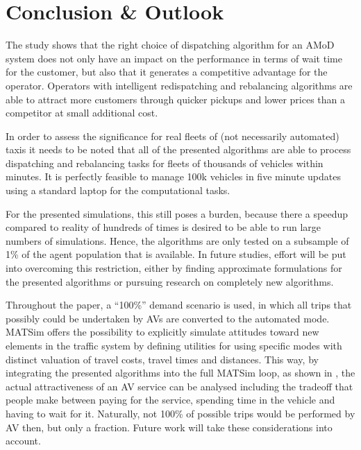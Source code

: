 \section{Conclusion \& Outlook}
\label{sec:Conclusion}

The study shows that the right choice of dispatching algorithm for an AMoD system
does not only have an impact on the performance in terms of wait time for
the customer, but also that it generates a competitive advantage for the
operator. Operators with intelligent redispatching and rebalancing algorithms are able to attract
more customers through quicker pickups and lower prices than a competitor at small additional cost.

In order to assess the significance for real fleets of (not necessarily
automated) taxis it needs to be noted that all of the presented algorithms are
able to process dispatching and rebalancing tasks for fleets of thousands of
vehicles within minutes. It is perfectly feasible to manage 100k vehicles in
five minute updates using a standard laptop for the computational tasks.

For the presented simulations, this still poses a burden, because there
a speedup compared to reality of hundreds of times is desired to be able
to run large numbers of simulations. Hence, the algorithms
are only tested on a subsample of 1\% of the agent population that is available.
In future studies, effort will be put into overcoming this restriction, either
by finding approximate formulations for the presented algorithms or pursuing research
on completely new algorithms.

Throughout the paper, a ``100\%'' demand scenario is used, in which all
trips that possibly could be undertaken by AVs are converted to the automated
mode. MATSim offers the possibility to explicitly
simulate attitudes toward new elements in the traffic system by defining utilities
for using specific modes with distinct valuation of travel costs, travel times and
distances. This way, by integrating the presented algorithms into the full
MATSim loop, as shown in \cite{horl_abmtrans17}, the actual attractiveness of an
AV service can be analysed including the tradeoff that people make between
paying for the service, spending time in the vehicle and having to wait for it.
Naturally, not 100\% of possible trips would be performed by AV then, but only
a fraction. Future work will take these considerations into account.
